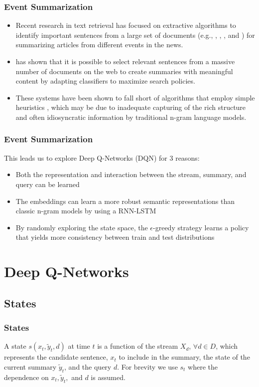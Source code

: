 \documentclass[]{beamer}
\begin{document}
\begin{frame}
	\frametitle{Event Summarization} 

	\begin{itemize}
		\item<1-> Recent research in text retrieval  has focused on extractive algorithms to identify important sentences from a large set of documents (e.g., \cite{diazquery}, \cite{kedzie2015predicting}, \cite{garbacea2015university}, and \cite{kedzieextractive}) for summarizing articles from different events in the news.
		\item<1-> \cite{kedzie2015predicting}  has shown that it is possible to select relevant sentences from a massive number of documents on the web to create summaries with meaningful content by adapting classifiers to maximize search policies.
		\item<1-> These systems have been shown to fall short of algorithms that employ simple heuristics \cite{garbacea2015university}, which may be due to inadequate capturing of the rich structure and often idiosyncratic information by traditional n-gram language models.
	\end{itemize}

\end{frame}

\begin{frame}
	\frametitle{Event Summarization} 
This leads us to explore Deep Q-Networks (DQN) for 3 reasons: 
	\begin{itemize}
	\item <1-> Both the representation and interaction between the stream, summary, and query can be learned
	\item <1 -> The embeddings can learn a more robust semantic representations than classic n-gram models by using a RNN-LSTM
	\item <1 -> By randomly exploring the state space, the $\epsilon$-greedy strategy learns a policy that yields more consistency between train and test distributions
	\end{itemize}
\end{frame}


\section{Deep Q-Networks}

	\subsection{States}  
	\begin{frame}
			\frametitle{States}
	A state $s(x_{t},\tilde{y}_{t}, d)$ at time $t$ is a function of the stream $X_d$, $\forall d \in D$, which represents the candidate sentence, $x_t$ to include in the summary, the state of the current summary $\tilde{y}_t$, and the query $d$. For brevity we use $s_t$ where the dependence on $x_{t},\tilde{y}_{t},$ and $d$ is assumed.
	\end{frame}
\end{document}
